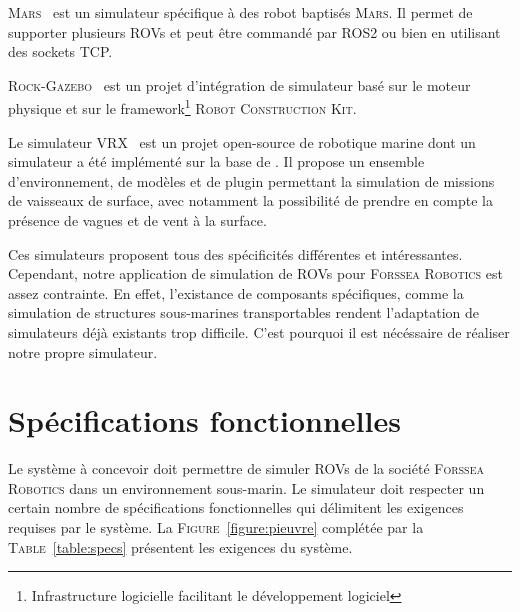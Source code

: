         \textsc{Mars}~\cite{MARS} est un simulateur spécifique à des robot baptisés \textsc{Mars}. Il permet de supporter plusieurs \gls{ROV}s et peut être commandé par \gls{ROS2} ou bien en utilisant des sockets TCP.
        
        \textsc{Rock-Gazebo}~\cite{Rock} est un projet d'intégration de simulateur basé sur le moteur physique \gazebo{} et sur le framework\footnote{Infrastructure logicielle facilitant le développement logiciel} \textsc{Robot Construction Kit}.
        
        Le simulateur \textsc{VRX}~\cite{bingham19toward} est un projet open-source de robotique marine dont un simulateur a été implémenté sur la base de \gazebo{}. Il propose un ensemble d'environnement, de modèles et de plugin permettant la simulation de missions de vaisseaux de surface, avec notamment la possibilité de prendre en compte la présence de vagues et de vent à la surface.

        Ces simulateurs proposent tous des spécificités différentes et intéressantes. Cependant, notre application de simulation de \gls{ROV}s pour \textsc{Forssea Robotics} est assez contrainte. En effet, l'existance de composants spécifiques, comme la simulation de structures sous-marines transportables rendent l'adaptation de simulateurs déjà existants trop difficile. C'est pourquoi il est nécéssaire de réaliser notre propre simulateur.

    \section{Spécifications fonctionnelles}
        \label{sec:spec_fonc}

        Le système à concevoir doit permettre de simuler \gls{ROV}s de la société \textsc{Forssea Robotics} dans un environnement sous-marin. Le simulateur doit respecter un certain nombre de spécifications fonctionnelles qui délimitent les exigences requises par le système. La \textsc{Figure}~\ref{figure:pieuvre} complétée par la \textsc{Table}~\ref{table:specs} présentent les exigences du système.

